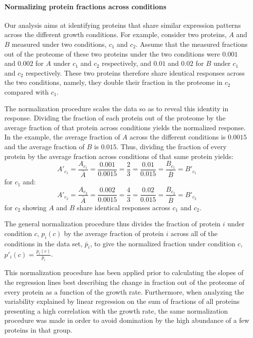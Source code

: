 \documentclass[10pt,letterpaper]{article}
\begin{document}
\paragraph{Normalizing protein fractions across conditions}

Our analysis aims at identifying proteins that share similar expression patterns across the different growth conditions.
For example, consider two proteins, $A$ and $B$ measured under two conditions, $c_1$ and $c_2$.
Assume that the measured fractions out of the proteome of these two proteins under the two conditions were $0.001$ and $0.002$ for $A$ under $c_1$ and $c_2$ respectively, and $0.01$ and $0.02$ for $B$ under $c_1$ and $c_2$ respectively.
These two proteins therefore share identical responses across the two conditions, namely, they double their fraction in the proteome in $c_2$ compared with $c_1$.

The normalization procedure scales the data so as to reveal this identity in response.
Dividing the fraction of each protein out of the proteome by the average fraction of that protein across conditions yields the normalized response.
In the example, the average fraction of $A$ across the different conditions is $0.0015$ and the average fraction of $B$ is $0.015$.
Thus, dividing the fraction of every protein by the average fraction across conditions of that same protein yields:
\[
A'_{c_1}=\frac{A_{c_1}}{\bar{A}}=\frac{0.001}{0.0015}=\frac{2}{3}=\frac{0.01}{0.015}=\frac{B_{c_1}}{\bar{B}}=B'_{c_1}
\]
for $c_1$ and:
\[
A'_{c_2}=\frac{A_{c_2}}{\bar{A}}=\frac{0.002}{0.0015}=\frac{4}{3}=\frac{0.02}{0.015}=\frac{B_{c_2}}{\bar{B}}=B'_{c_2}
\]
for $c_2$ showing $A$ and $B$ share identical responses across $c_1$ and $c_2$.

The general normalization procedure thus divides the fraction of protein $i$ under condition $c$, $p_i(c)$ by the average fraction of protein $i$ across all of the conditions in the data set, $\bar{p}_i$, to give the normalized fraction under condition $c$, $p'_i(c)=\frac{p_i(c)}{\bar{p}_i}$.

This normalization procedure has been applied prior to calculating the slopes of the regression lines best describing the change in fraction out of the proteome of every protein as a function of the growth rate.
Furthermore, when analyzing the variability explained by linear regression on the sum of fractions of all proteins presenting a high correlation with the growth rate, the same normalization procedure was made in order to avoid domination by the high abundance of a few proteins in that group.
\end{document}
